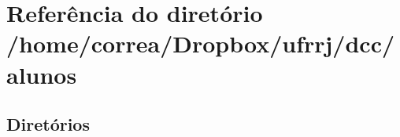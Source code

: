\section{Referência do diretório /home/correa/\+Dropbox/ufrrj/dcc/alunos}
\label{dir_1f8b31e4a41c0881cdae01deefd1df5e}
\subsection*{Diretórios}
\begin{DoxyCompactItemize}
\end{DoxyCompactItemize}
